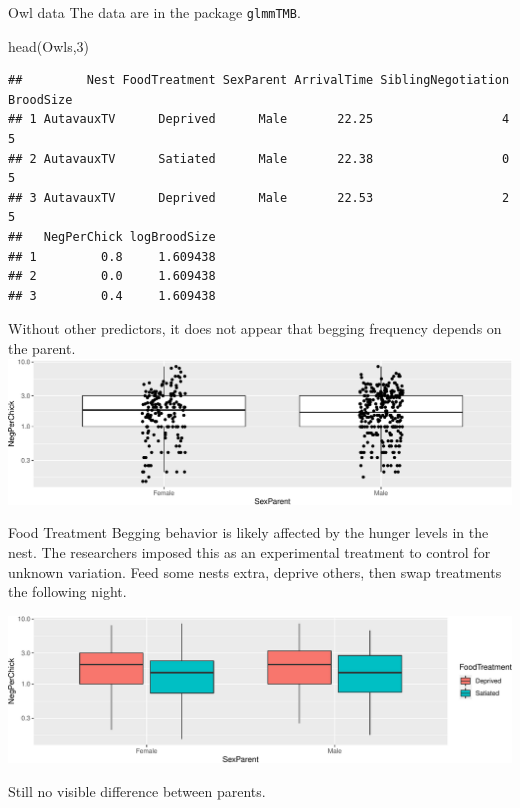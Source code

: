 \documentclass[
  ignorenonframetext,
]{beamer}
\newenvironment{Shaded}{\begin{snugshade}}{\end{snugshade}}
\newcommand{\DecValTok}[1]{\textcolor[rgb]{0.00,0.00,0.81}{#1}}
\newcommand{\FunctionTok}[1]{\textcolor[rgb]{0.00,0.00,0.00}{#1}}
\newcommand{\NormalTok}[1]{#1}
\begin{document}
\begin{frame}[fragile]{Owl data}
\protect\hypertarget{owl-data}{}
The data are in the package \texttt{glmmTMB}.

\tiny

\begin{Shaded}
\begin{Highlighting}[]
\FunctionTok{head}\NormalTok{(Owls,}\DecValTok{3}\NormalTok{)}
\end{Highlighting}
\end{Shaded}

\begin{verbatim}
##         Nest FoodTreatment SexParent ArrivalTime SiblingNegotiation BroodSize
## 1 AutavauxTV      Deprived      Male       22.25                  4         5
## 2 AutavauxTV      Satiated      Male       22.38                  0         5
## 3 AutavauxTV      Deprived      Male       22.53                  2         5
##   NegPerChick logBroodSize
## 1         0.8     1.609438
## 2         0.0     1.609438
## 3         0.4     1.609438
\end{verbatim}

\normalsize

Without other predictors, it does not appear that begging frequency
depends on the parent.
\includegraphics{mixed_models_files/figure-beamer/unnamed-chunk-4-1.pdf}
\end{frame}

\begin{frame}{Food Treatment}
\protect\hypertarget{food-treatment}{}
Begging behavior is likely affected by the hunger levels in the nest.
The researchers imposed this as an experimental treatment to control for
unknown variation. Feed some nests extra, deprive others, then swap
treatments the following night.

\includegraphics{mixed_models_files/figure-beamer/unnamed-chunk-5-1.pdf}

Still no visible difference between parents.
\end{frame}
\end{document}
